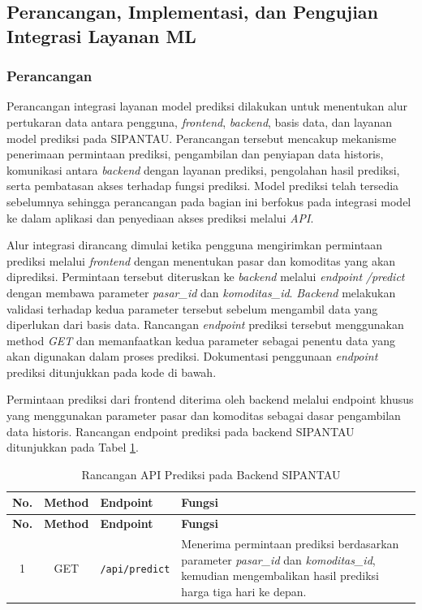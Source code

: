 \subsection{Perancangan, Implementasi, dan Pengujian Integrasi Layanan ML}

\subsubsection{Perancangan}

Perancangan integrasi layanan model prediksi dilakukan untuk menentukan alur pertukaran data antara pengguna, \textit{frontend}, \textit{backend}, basis data, dan layanan model prediksi pada SIPANTAU. Perancangan tersebut mencakup mekanisme penerimaan permintaan prediksi, pengambilan dan penyiapan data historis, komunikasi antara \textit{backend} dengan layanan prediksi, pengolahan hasil prediksi, serta pembatasan akses terhadap fungsi prediksi. Model prediksi telah tersedia sebelumnya sehingga perancangan pada bagian ini berfokus pada integrasi model ke dalam aplikasi dan penyediaan akses prediksi melalui \textit{API}. 

Alur integrasi dirancang dimulai ketika pengguna mengirimkan permintaan prediksi melalui \textit{frontend} dengan menentukan pasar dan komoditas yang akan diprediksi. Permintaan tersebut diteruskan ke \textit{backend} melalui \textit{endpoint} \textit{/predict} dengan membawa parameter \textit{pasar\_id} dan \textit{komoditas\_id}. \textit{Backend} melakukan validasi terhadap kedua parameter tersebut sebelum mengambil data yang diperlukan dari basis data. Rancangan \textit{endpoint} prediksi tersebut menggunakan method \textit{GET} dan memanfaatkan kedua parameter sebagai penentu data yang akan digunakan dalam proses prediksi. Dokumentasi penggunaan \textit{endpoint} prediksi ditunjukkan pada kode di bawah.

Permintaan prediksi dari frontend diterima oleh backend melalui endpoint khusus yang menggunakan parameter pasar dan komoditas sebagai dasar pengambilan data historis. Rancangan endpoint prediksi pada backend SIPANTAU ditunjukkan pada Tabel \ref{tab:api-prediksi-backend}.

\begin{longtable}{|c|c|p{3.2cm}|p{6cm}|}
\caption{Rancangan API Prediksi pada Backend SIPANTAU}
\label{tab:api-prediksi-backend} \\

\hline
\textbf{No.} & \textbf{Method} & \textbf{Endpoint} & \textbf{Fungsi} \\
\hline
\endfirsthead

\hline
\textbf{No.} & \textbf{Method} & \textbf{Endpoint} & \textbf{Fungsi} \\
\hline
\endhead

1 & GET & \texttt{/api/predict} &
Menerima permintaan prediksi berdasarkan parameter \textit{pasar\_id} dan \textit{komoditas\_id}, kemudian mengembalikan hasil prediksi harga tiga hari ke depan. \\ \hline

\end{longtable}

